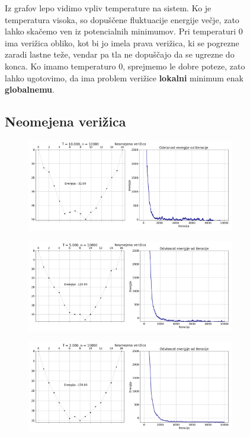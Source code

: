 \documentclass[11pt, a4paper]{article}
\begin{document}
\begin{figure}[H]
\begin{figure}[H]
\end{figure} 
Iz grafov lepo vidimo vpliv temperature na sistem. Ko je temperatura visoka, so dopuščene fluktuacije energije večje, zato lahko skačemo ven iz potencialnih minimumov. Pri temperaturi 0 ima verižica obliko, kot bi jo imela prava verižica, ki se pogrezne zaradi lastne teže, vendar pa tla ne dopuščajo da se ugrezne do konca. Ko imamo temperaturo 0, sprejmemo le dobre poteze, zato lahko ugotovimo, da ima problem verižice \textbf{lokalni} minimum enak \textbf{globalnemu}.
\subsection{Neomejena verižica}  
\begin{figure}[H]
\centering

  \includegraphics[width=16cm, height=4cm]{neomejena_globina_T0_10.png}
 
\end{figure} 
\begin{figure}[H]
\centering

  \includegraphics[width=16cm, height=4cm]{neomejena_globina_T0_5.png}
 
\end{figure} 
\begin{figure}[H]
\centering

  \includegraphics[width=16cm, height=4cm]{neomejena_globina_T0_2.png}
 

\end{figure}
\end{figure}
\end{document}
